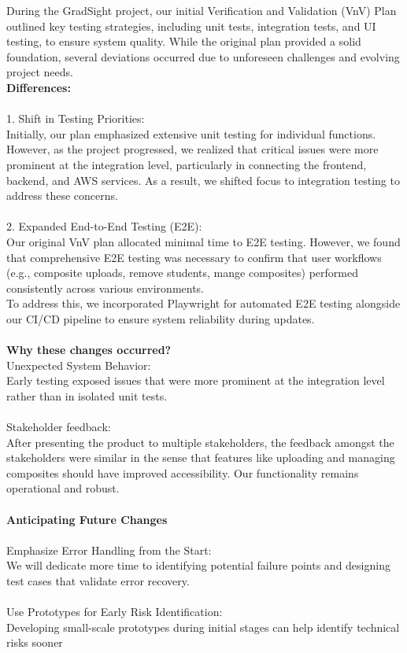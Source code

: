 \documentclass[12pt, titlepage]{article}
\begin{document}
\begin{enumerate}
  During the GradSight project, our initial Verification and Validation (VnV) Plan outlined key testing strategies, including unit tests, integration tests, and UI testing, to ensure system quality. While the original plan provided a solid foundation, several deviations occurred due to unforeseen challenges and evolving project needs. \\

 \textbf{Differences:} \\
\\1. Shift in Testing Priorities: \\
Initially, our plan emphasized extensive unit testing for individual functions. However, as the project progressed, we realized that critical issues were more prominent at the integration level, particularly in connecting the frontend, backend, and AWS services. As a result, we shifted focus to integration testing to address these concerns. \\
\\2. Expanded End-to-End Testing (E2E):  \\
Our original VnV plan allocated minimal time to E2E testing. However, we found that comprehensive E2E testing was necessary to confirm that user workflows (e.g., composite uploads, remove students, mange composites) performed consistently across various environments.\\
To address this, we incorporated Playwright for automated E2E testing alongside our CI/CD pipeline to ensure system reliability during updates.\\
\\ \textbf{Why these changes occurred?}\\

Unexpected System Behavior: \\Early testing exposed issues that were more prominent at the integration level rather than in isolated unit tests.\\
\\Stakeholder feedback:\\ After presenting the product to multiple stakeholders, the feedback amongst the stakeholders were similar in the sense that features like uploading and managing composites should have improved accessibility. Our functionality remains operational and robust. \\
\\\textbf{Anticipating Future Changes}\\
\\Emphasize Error Handling from the Start: \\We will dedicate more time to identifying potential failure points and designing test cases that validate error recovery.\\
\\Use Prototypes for Early Risk Identification: \\Developing small-scale prototypes during initial stages can help identify technical risks sooner\\
\end{enumerate}
\end{document}
